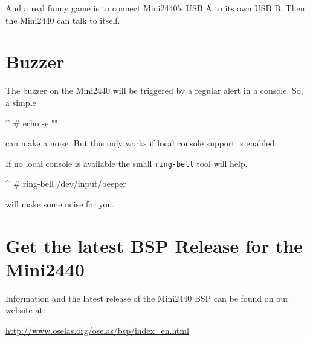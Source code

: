 And a real funny game is to connect Mini2440's USB A to its own USB B. Then
the Mini2440 can talk to itself.


\section{Buzzer}					\label{sec:Buzzer}

The buzzer on the Mini2440 will be triggered by a regular alert in a console.
So, a simple

\begin{ptxshell}[escapechar=|]{^}
# echo -e "\a"
\end{ptxshell}

can make a noise. But this only works if local console support is enabled.

If no local console is available the small \texttt{ring-bell} tool will help.

\begin{ptxshell}[escapechar=|]{^}
# ring-bell /dev/input/beeper
\end{ptxshell}

will make some noise for you.

%
%
%


\section{Get the latest BSP Release for the Mini2440}

Information and the latest release of the Mini2440 BSP can be found on
our website at:

\url{http://www.oselas.org/oselas/bsp/index\_en.html}


